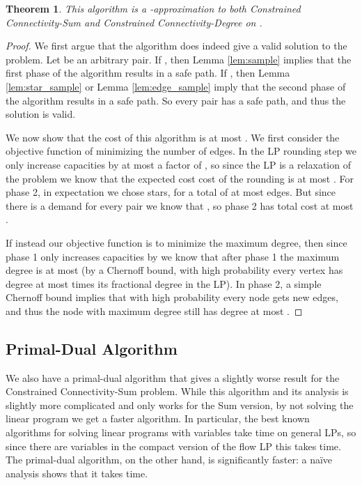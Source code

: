 \documentclass[11pt,letterpaper]{article}
\newtheorem{theorem}{Theorem}[section]
\theoremstyle{definition}
\begin{document}
\begin{theorem} \label{thm:approx}
  This algorithm is a -approximation to both {\sc Constrained Connectivity-Sum} and {\sc Constrained Connectivity-Degree} on .
\end{theorem}
\begin{proof}
  We first argue that the algorithm does indeed give a valid solution
  to the problem.  Let  be an arbitrary pair.  If , then Lemma \ref{lem:sample} implies that the first phase of
  the algorithm results in a safe path.  If ,
  then Lemma \ref{lem:star_sample} or Lemma \ref{lem:edge_sample}
  imply that the second phase of the algorithm results in a safe path.
  So every pair has a safe path, and thus the solution is valid.

  We now show that the cost of this algorithm is at most
  .  We first consider the objective
  function of minimizing the number of edges.  In the LP rounding step we only
  increase capacities by at most a factor of , so since the
  LP is a relaxation of the problem we know that the expected cost cost of
  the rounding is at most .  For phase 2, in
  expectation we chose  stars, for a total of at most
   edges.  But since there is a demand for every pair
  we know that , so phase 2 has total cost at most
  .

  If instead our objective function is to minimize the maximum degree,
  then since phase 1 only increases capacities by  we know
  that after phase 1 the maximum degree is at most  (by a Chernoff bound, with high probability every vertex has degree at most  times its fractional degree in the LP).  In phase 2, a simple Chernoff bound implies that with high
  probability every node gets  new edges, and thus
  the node with maximum degree still has degree at most
  .
\end{proof}

\subsection{Primal-Dual Algorithm} \label{sec:PD}

We also have a primal-dual algorithm that gives a slightly worse result for the {\sc Constrained Connectivity-Sum} problem.  While this algorithm and its analysis is slightly more complicated and only works for the Sum version, by not solving the linear program we get a faster algorithm.  In particular, the best known algorithms for solving linear programs with  variables take  time on general LPs, so since there are  variables in the compact version of the flow LP this takes  time.  The primal-dual algorithm, on the other hand, is significantly faster: a na\"{i}ve analysis shows that it takes  time.
\end{document}
